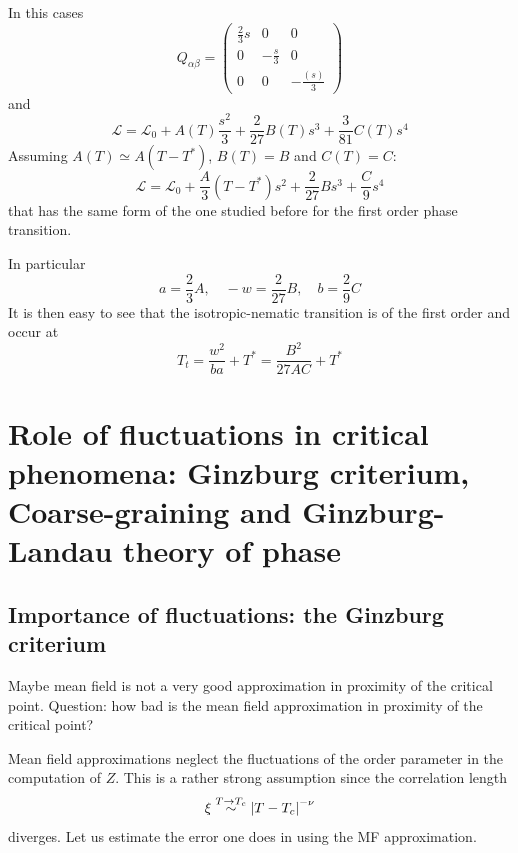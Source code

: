 \documentclass[../main/main.tex]{subfiles}
\begin{document}
In this cases
\begin{equation}
  Q_{\alpha \beta } =
  \begin{pmatrix}
  \frac{2}{3}s   & 0  & 0 \\
    0 &  - \frac{s  }{3} & 0 \\
    0 &  0 & - \frac{(s )}{3}
  \end{pmatrix}
\end{equation}
and
\begin{equation}
  \mathcal{L} = \mathcal{L}_0 + A(T) \frac{s^2}{3} + \frac{2}{27} B(T) s^3 + \frac{3}{81} C(T) s^4
\end{equation}
Assuming \( A(T) \simeq A (T-T^*) \), \( B(T) =B \) and \( C(T) = C \):
\begin{equation}
  \mathcal{L} = \mathcal{L}_0 + \frac{A}{3} (T-T^*) s^2 + \frac{2}{27} B s^3 + \frac{C}{9} s^4
\end{equation}
that has the same form of the one studied before for the first order phase transition.

In particular
\begin{equation}
  a = \frac{2}{3} A, \quad -w = \frac{2}{27} B, \quad b = \frac{2}{9} C
\end{equation}
It is then easy to see that the isotropic-nematic transition is of the first order and occur at
\begin{equation}
  T_t = \frac{w^2}{ba} + T^* = \frac{B^2}{27 A C} + T^*
\end{equation}



\chapter{Role of fluctuations in critical phenomena: Ginzburg criterium, Coarse-graining and Ginzburg-Landau theory of phase}

\section{Importance of fluctuations: the Ginzburg criterium}
Maybe mean field is not a very good approximation in proximity of the critical point. Question: how bad is the mean field approximation in proximity of the critical point?

Mean field approximations neglect the fluctuations of the order parameter in the computation of \( Z \).
This is a rather strong assumption since the correlation length
\begin{equation}
   \xi \overset{T \rightarrow T_c}{\sim } \abs{T-T_c}^{-\nu }
\end{equation}
diverges. Let us estimate the error one does in using the MF approximation.
\end{document}
